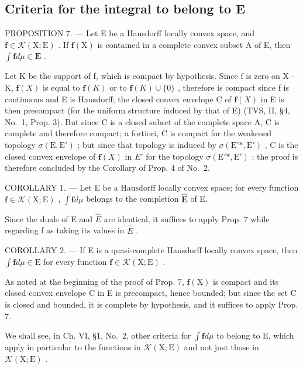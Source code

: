 \subsection{Criteria for the integral to belong to E}

PROPOSITION 7. --- Let E be a Hausdorff locally convex space, and \(\mathbf{f} \in \mathcal{K}(\mathrm{X};\mathrm{E})\) . If \(\mathbf{f}(\mathrm{X})\) is contained in a complete convex subset A of E, then \(\int \mathbf{f} d\mu \in \mathbf{E}\) .

Let K be the support of f, which is compact by hypothesis. Since f is zero on X - K, \(\mathbf{f}(X)\) is equal to \(\mathbf{f}(K)\) or to \(\mathbf{f}(K) \cup \{0\}\) , therefore is compact since f is continuous and E is Hausdorff; the closed convex envelope C of \(\mathbf{f}(X)\) in E is then precompact (for the uniform structure induced by that of E) (TVS, II, §4, No.~1, Prop. 3). But since C is a closed subset of the complete space A, C is complete and therefore compact; a fortiori, C is compact for the weakened topology \(\sigma(\mathrm{E}, \mathrm{E}')\) ; but since that topology is induced by \(\sigma(\mathrm{E}'*, \mathrm{E}')\) , C is the closed convex envelope of \(\mathbf{f}(X)\) in \(E'\) for the topology \(\sigma(\mathrm{E}'*, \mathrm{E}')\) ; the proof is therefore concluded by the Corollary of Prop. 4 of No.~2.

COROLLARY 1. --- Let E be a Hausdorff locally convex space; for every function \(\mathbf{f} \in \mathcal{K}(\mathrm{X};\mathrm{E})\) , \(\int \mathbf{f} d\mu\) belongs to the completion \(\widehat{\mathbf{E}}\) of E.

Since the duals of E and \(\widehat{E}\) are identical, it suffices to apply Prop. 7 while regarding f as taking its values in \(\widehat{E}\) .

COROLLARY 2. --- If E is a quasi-complete Hausdorff locally convex space, then \(\int \mathbf{f} d\mu \in \mathrm{E}\) for every function \(\mathbf{f} \in \mathcal{K}(\mathrm{X};\mathrm{E})\) .

As noted at the beginning of the proof of Prop. 7, \(\mathbf{f}(\mathrm{X})\) is compact and its closed convex envelope C in E is precompact, hence bounded; but since the set C is closed and bounded, it is complete by hypothesis, and it suffices to apply Prop. 7.

We shall see, in Ch. VI, §1, No.~2, other criteria for \(\int \mathbf{f} d\mu\) to belong to E, which apply in particular to the functions in \(\widetilde{\mathcal{K}}(\mathrm{X};\mathrm{E})\) and not just those in \(\mathcal{K}(\mathrm{X};\mathrm{E})\) .

